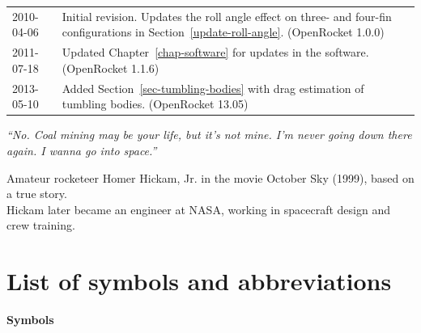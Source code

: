 \documentclass[a4paper,12pt,oneside]{book}
\begin{document}
\begin{center}
\begin{tabular}{lp{120mm}}
2010-04-06 & Initial revision.  Updates the roll angle effect on three- and
four-fin configurations in Section~\ref{update-roll-angle}.
(OpenRocket 1.0.0) \\
2011-07-18 & Updated Chapter~\ref{chap-software} for updates in the
software.  (OpenRocket 1.1.6) \\
2013-05-10 & Added Section~\ref{sec-tumbling-bodies} with drag
estimation of tumbling bodies.  (OpenRocket 13.05)
\end{tabular}
\end{center}

\vfill





\clearpage
\thispagestyle{empty}

\mbox{}
\vfill
{\it ``No. Coal mining may be your life, but it's not mine. I'm never
  going down there again. I wanna go into space.''}
\vspace{5mm}

\hspace{10mm}\parbox{130mm}{
Amateur rocketeer Homer Hickam, Jr. in the movie October Sky (1999), based
on a true story.\\

Hickam later became an engineer at NASA, working in spacecraft design
and crew training.}
\vfill





\tableofcontents

%

\newpage
\section*{List of symbols and abbreviations}

{\bf Symbols}
\nopagebreak
\end{document}
